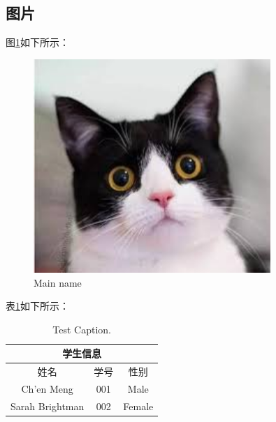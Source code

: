 \documentclass[a4paper, 12pt, centering]{article}
\begin{document}
\subsection{图片}
图\ref{Fig.main}如下所示：
\begin{figure}[H] %
\centering %
\includegraphics[width=0.8\textwidth]{./Figure/example1.jpeg} %
\caption{Main name} %
\label{Fig.main} %
\end{figure}

表\ref{tab.main}如下所示：
\begin{table}[H]
\centering
\caption{Test Caption.}
\begin{tabular}{|c|c|c|}
\hline
\multicolumn{3}{|c|}{学生信息}\\
\hline
姓名& 学号& 性别\\
\hline
Ch'en Meng& 001& Male\\
Sarah Brightman& 002& Female\\
\hline
\end{tabular}
\label{tab.main}
\end{table}
\end{document}
